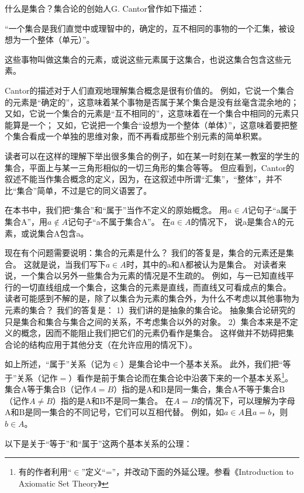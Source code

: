 什么是集合？集合论的创始人G. Cantor曾作如下描述：

“一个集合是我们直觉中或理智中的，确定的，互不相同的事物的一个汇集，被设想为一个整体（单元）”。

这些事物叫做这集合的元素，或说这些元素属于这集合，也说这集合包含这些元素。

Cantor的描述对于人们直观地理解集合概念是很有价值的。
例如，它说一个集合的元素是“确定的”，这意味着某个事物是否属于某个集合是没有丝毫含混余地的；
又如，它说一个集合的元素是“互不相同的”，这意味着在一个集合中相同的元素只能算是一个；
又如，它说把一个集合“设想为一个整体（单体）”，这意味着要把整个集合看成一个单独的思维对象，而不再看成那些个别元素的简单积累。

读者可以在这样的理解下举出很多集合的例子，如在某一时刻在某一教室的学生的集合，平面上与某一三角形相似的一切三角形的集合等等。
但应看到，Cantor的叙述不能当作集合概念的定义，因为，在这叙述中所谓“汇集”，“整体”，并不比“集合”简单，不过是它的同义语罢了。

在本书中，我们把“集合”和“属于”当作不定义的原始概念。
用$a \in A$记句子“a属于集合A”，用$a \notin A$记句子“a不属于集合A”。
在$a \in A$的情况下， 说a是集合A的元素，或说集合A包含a。

现在有个问题需要说明：集合的元素是什么？
我们的答复是，集合的元素还是集合。
这就是说，当我们写下$a \in A$时，其中的a和A都被认为是集合。
对读者来说，一个集合以另外一些集合为元素的情况是不生疏的。
例如，与一已知直线平行的一切直线组成一个集合，这集合的元素是直线，而直线又可看成点的集合。
读者可能感到不解的是，除了以集合为元素的集合外，为什么不考虑以其他事物为元素的集合？
我们的答复是：
1）我们讲的是抽象的集合论。
抽象集合论研究的只是集合和集合与集合之间的关系，不考虑集合以外的对象。
2）集合本来是不定义的概念，因而不能阻止我们把它们的元素仍看作是集合。
这样做并不妨碍把集合论的结构应用于其他分支（在允许应用的情况下）。

如上所述，“属于”关系（记为$\in$）是集合论中一个基本关系。
此外，我们把“等于”关系（记作$=$）看作是前于集合论而在集合论中沿袭下来的一个基本关系\footnote{有的作者利用“$\in$”定义“=”，并改动下面的外延公理。参看《Introduction to Axiomatic Set Theory》}。
集合A等于集合B（记作$A=B$）指的是A和B是同一集合，集合A不等于集合B（记作$A \neq B$）指的是A和B不是同一集合。
在$A = B$的情况下，可以理解为字母A和B是同一集合的不同记号，它们可以互相代替。
例如，如$a \in A$且$a = b$，则$b \in A$。

以下是关于“等于”和“属于”这两个基本关系的公理：


